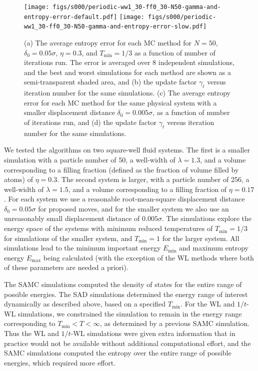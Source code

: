 \documentclass[letterpaper,twocolumn,amsmath,amssymb,pre,aps,10pt]{revtex4-1}
\begin{document}
\begin{figure}
  \texttt{[image: figs/s000/periodic-ww1\_30-ff0\_30-N50-gamma-and-entropy-error-default.pdf]}%
\texttt{[image: figs/s000/periodic-ww1\_30-ff0\_30-N50-gamma-and-entropy-error-slow.pdf]}
  \caption{(a) The average entropy error for each MC method for $N=50$,
               $\delta_0 = 0.05\sigma$, $\eta = 0.3$, and $T_{\min} = 1/3$
               as a function of number of iterations run. The error is
               averaged over 8 independent simulations, and the best
               and worst simulations for each method are shown as a
               semi-transparent shaded area, and
           (b) the update factor $\gamma_t$ versus iteration number
               for the same simulations.
           (c) The average entropy error for each MC method for the
               same physical system with a smaller displacement distance
               $\delta_0 = 0.005\sigma$,
               as a function of number of iterations run, and
           (d) the update factor $\gamma_t$ versus iteration number
               for the same simulations.
  }\label{fig:fast-slow-gamma}
\end{figure}

We tested the algorithms on two square-well fluid systems.  The first
is a smaller simulation with a particle number of 50, a well-width of
$\lambda = 1.3$, and a volume corresponding to a filling fraction
(defined as the fraction of volume filled by atoms) of $\eta =
0.3$. The second system is larger, with a particle number of 256, a
well-width of $\lambda = 1.5$, and a volume corresponding to a filling
fraction of $\eta = 0.17$.  For each system we use a reasonable
root-mean-square displacement distance $\delta_0 = 0.05\sigma$ for
proposed moves, and for the smaller system we also use an unreasonably
small displacement distance of $0.005\sigma$. The simulations explore
the energy space of the systems with minimum reduced temperatures of
$T_{\text{min}} = 1/3$ for simulations of the smaller system, and
$T_{\min}=1$ for the larger system.  All simulations lead to the
minimum important energy $E_{\min}$ and maximum entropy energy
$E_{\max}$ being calculated (with the exception of the WL methods
where both of these parameters are needed a priori).

The SAMC simulations
computed the density of states for the entire range of possible
energies.  The SAD simulations determined the energy range of interest
dynamically as described above, based on a specified $T_{\min}$.  For
the WL and $1/t$-WL simulations, we constrained the simulation to
remain in the energy range corresponding to $T_{\min} < T < \infty$,
as determined by a previous SAMC simulation.  Thus the WL and $1/t$-WL
simulations were given extra information that in practice would not be
available without additional computational effort, and the SAMC simulations
computed the entropy over the entire range of possible energies, which
required more effort.
\end{document}
